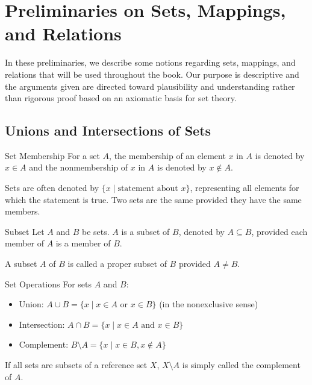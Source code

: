 \section{Preliminaries on Sets, Mappings, and Relations}

\begin{note}
In these preliminaries, we describe some notions regarding sets, mappings, and relations that will be used throughout the book. Our purpose is descriptive and the arguments given are directed toward plausibility and understanding rather than rigorous proof based on an axiomatic basis for set theory.
\end{note}

\subsection{Unions and Intersections of Sets}

\begin{definitionbox}{Set Membership}
For a set $A$, the membership of an element $x$ in $A$ is denoted by $x \in A$ and the nonmembership of $x$ in $A$ is denoted by $x \notin A$. 

Sets are often denoted by $\{x \mid \text{statement about } x\}$, representing all elements for which the statement is true. Two sets are the same provided they have the same members.
\end{definitionbox}

\begin{definitionbox}{Subset}
Let $A$ and $B$ be sets. $A$ is a subset of $B$, denoted by $A \subseteq B$, provided each member of $A$ is a member of $B$. 

A subset $A$ of $B$ is called a proper subset of $B$ provided $A \neq B$.
\end{definitionbox}

\begin{definitionbox}{Set Operations}
For sets $A$ and $B$:
\begin{itemize}
    \item Union: $A \cup B = \{x \mid x \in A \text{ or } x \in B\}$ (in the nonexclusive sense)
    \item Intersection: $A \cap B = \{x \mid x \in A \text{ and } x \in B\}$
    \item Complement: $B \setminus A = \{x \mid x \in B, x \notin A\}$
\end{itemize}

If all sets are subsets of a reference set $X$, $X \setminus A$ is simply called the complement of $A$.
\end{definitionbox}

